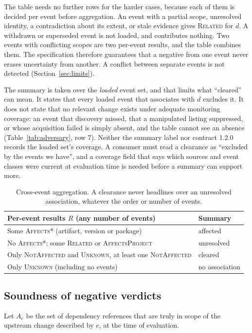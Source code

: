 \documentclass[11pt,a4paper]{article}
\begin{document}
The table needs no further rows for the harder cases, because each of
them is decided per event before aggregation. An event with a partial
scope, unresolved identity, a contradiction about its extent, or
stale evidence gives \textsc{Related} for $d$. A withdrawn or
superseded event is not loaded, and contributes nothing. Two events
with conflicting scopes are two per-event results, and the table
combines them. The specification therefore guarantees that a negative
from one event never erases uncertainty from another. A conflict
between separate events is not detected (Section~\ref{sec:limits}).

The summary is taken over the \emph{loaded} event set, and that limits
what ``cleared'' can mean. It states that every loaded event that
associates with $d$ excludes it. It does not state that no relevant
change exists under adequate monitoring coverage: an event that
discovery missed, that a manipulated listing suppressed, or whose
acquisition failed is simply absent, and the table cannot see an
absence (Table~\ref{tab:adversary}, row 7). Neither the summary label
nor contract 1.2.0 records the loaded set's coverage. A consumer must read a
clearance as ``excluded by the events we have'', and a coverage field
that says which sources and event classes were current at evaluation
time is needed before a summary can support more.

\begin{table}[t]
\centering
\footnotesize
\begin{tabularx}{\linewidth}{@{}>{\raggedright\arraybackslash}X l@{}}
\toprule
Per-event results $R$ (any number of events) & Summary \\
\midrule
Some \textsc{Affects*} (artifact, version or package) & affected \\
No \textsc{Affects*}; some \textsc{Related} or \textsc{AffectsProject} & unresolved \\
Only \textsc{NotAffected} and \textsc{Unknown}, at least one \textsc{NotAffected} & cleared \\
Only \textsc{Unknown} (including no events) & no association \\
\bottomrule
\end{tabularx}
\caption{Cross-event aggregation. A clearance never headlines over an
unresolved association, whatever the order or number of events.}
\label{tab:xevent}
\end{table}

\subsection{Soundness of negative verdicts}
\label{sec:soundness}
Let $A_e$ be the set of dependency references that are truly in scope
of the upstream change described by $e$, at the time of evaluation.
\end{document}
